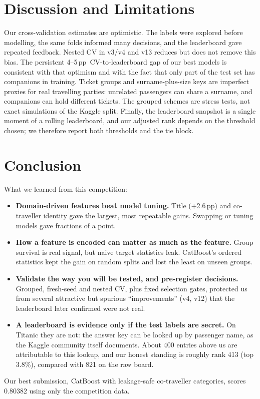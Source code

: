 \documentclass[10pt,twocolumn,letterpaper]{article}
\newcommand{\pp}{\,pp}
\begin{document}
\section{Discussion and Limitations}
Our cross-validation estimates are optimistic. The labels were explored before modelling, the same folds informed many decisions, and the leaderboard gave repeated feedback. Nested CV in v3/v4 and v13 reduces but does not remove this bias. The persistent 4--5\pp\ CV-to-leaderboard gap of our best models is consistent with that optimism and with the fact that only part of the test set has companions in training. Ticket groups and surname-plus-size keys are imperfect proxies for real travelling parties: unrelated passengers can share a surname, and companions can hold different tickets. The grouped schemes are stress tests, not exact simulations of the Kaggle split. Finally, the leaderboard snapshot is a single moment of a rolling leaderboard, and our adjusted rank depends on the threshold chosen; we therefore report both thresholds and the tie block.

\section{Conclusion}
What we learned from this competition:
\begin{itemize}
\item \textbf{Domain-driven features beat model tuning.} Title (+2.6\pp) and co-traveller identity gave the largest, most repeatable gains. Swapping or tuning models gave fractions of a point.
\item \textbf{How a feature is encoded can matter as much as the feature.} Group survival is real signal, but naive target statistics leak. CatBoost's ordered statistics kept the gain on random splits and lost the least on unseen groups.
\item \textbf{Validate the way you will be tested, and pre-register decisions.} Grouped, fresh-seed and nested CV, plus fixed selection gates, protected us from several attractive but spurious ``improvements'' (v4, v12) that the leaderboard later confirmed were not real.
\item \textbf{A leaderboard is evidence only if the test labels are secret.} On Titanic they are not: the answer key can be looked up by passenger name, as the Kaggle community itself documents. About 400 entries above us are attributable to this lookup, and our honest standing is roughly rank 413 (top 3.8\%), compared with 821 on the raw board.
\end{itemize}
Our best submission, CatBoost with leakage-safe co-traveller categories, scores 0.80382 using only the competition data.
\end{document}
